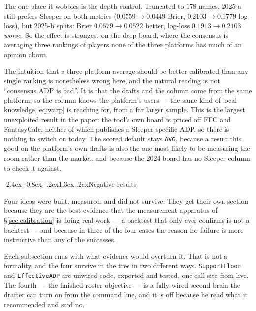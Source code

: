 \documentclass[10pt,a4paper]{article}
\makeatletter
\theoremstyle{plain}
\theoremstyle{definition}
\theoremstyle{remark}
\newcommand{\code}[1]{\texttt{\small #1}}
\renewcommand\section{\@startsection{section}{1}{\z@}%
  {-2.4ex \@plus -0.8ex \@minus -.2ex}{1.3ex \@plus.2ex}{\normalfont\Large\bfseries}}
\makeatother
\begin{document}
The one place it wobbles is the depth control. Truncated to $178$ names, 2025-a still
prefers Sleeper on both metrics ($0.0559 \to 0.0449$ Brier, $0.2103 \to 0.1779$ log-loss),
but 2025-b splits: Brier $0.0579 \to 0.0522$ better, log-loss $0.1913 \to 0.2103$
\emph{worse}. So the effect is strongest on the deep board, where the consensus is
averaging three rankings of players none of the three platforms has much of an opinion
about.

The intuition that a three-platform average should be better calibrated than any single
ranking is nonetheless wrong here, and the natural reading is not ``consensus ADP is
bad''. It is that the drafts and the column come from the same platform, so the column
knows the platform's users --- the same kind of local knowledge \eqref{eq:warp} is
reaching for, from a far larger sample. This is the largest unexploited result in the
paper: the tool's own board is priced off FFC and FantasyCalc, neither of which publishes
a Sleeper-specific ADP, so there is nothing to switch on today. The scored default stays
\code{AVG}, because a result this good on the platform's own drafts is also the one most
likely to be measuring the room rather than the market, and because the 2024 board has no
Sleeper column to check it against.

\section{Negative results}
\label{sec:negative}

Four ideas were built, measured, and did not survive. They get their own section
because they are the best evidence that the measurement apparatus of
\S\ref{sec:calibration} is doing real work --- a backtest that only ever confirms is not
a backtest --- and because in three of the four cases the reason for failure is more
instructive than any of the successes.

Each subsection ends with what evidence would overturn it. That is not a formality, and
the four survive in the tree in two different ways. \code{SupportFloor} and
\code{EffectiveADP} are unwired code, exported and tested, one call site from live. The
fourth --- the finished-roster objective --- is a fully wired second brain the drafter can
turn on from the command line, and it is off because he read what it recommended and said
no.
\end{document}
